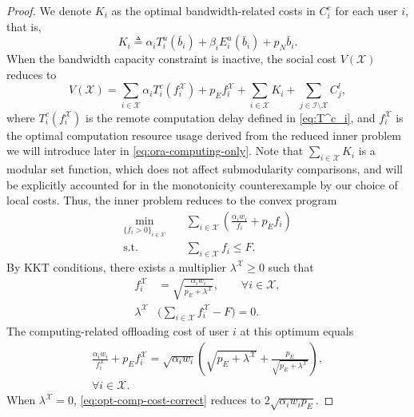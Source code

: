 \documentclass[lettersize,journal]{IEEEtran}
\begin{document}
\begin{proof}
We denote $K_i$ as the optimal bandwidth-related costs in $C^e_i$ for each user $i$, that is,
\begin{equation}
    K_i\triangleq\alpha_iT^u_i(\bar b_i)+\beta_iE^u_i(\bar b_i)+p_N\bar b_i.
\end{equation}
When the bandwidth capacity constraint is inactive, the social cost $V(\mathcal{X})$ reduces to
\begin{equation}
    V(\mathcal{X})=\sum_{i\in\mathcal{X}}\alpha_iT^c_i(f_i^\mathcal{X})+p_Ef_i^{\mathcal{X}}+\sum_{i\in\mathcal{X}}K_i+\sum_{j\in\mathcal{I}\setminus\mathcal{X}}C^l_j,
\end{equation}
where $T^c_i(f_i^\mathcal{X})$ is the remote computation delay defined in \eqref{eq:T^c_i}, and $f_i^{\mathcal{X}}$ is the optimal computation resource usage derived from the reduced inner problem we will introduce later in \eqref{eq:ora-computing-only}. Note that $\sum_{i\in\mathcal{X}}K_i$ is a modular set function, which does not affect submodularity comparisons, and will be explicitly accounted for in the monotonicity counterexample by our choice of local costs.
Thus, the inner problem reduces to the convex program
\begin{align}
\min_{\{f_i>0\}_{i\in\mathcal{X}}}\quad
&\sum_{i\in\mathcal{X}}
\left(\frac{\alpha_i w_i}{f_i}+p_E f_i\right)
\label{eq:ora-computing-only}\\
\text{s.t.}\quad
&\sum_{i\in\mathcal{X}} f_i \le F .
\nonumber
\end{align}
By KKT conditions, there exists a multiplier $\lambda^{\mathcal{X}}\ge 0$ such that
\begin{subequations}\label{eq:kkt-fi}
    \begin{align}
f_i^{\mathcal{X}}
&=
\sqrt{\frac{\alpha_i w_i}{p_E+\lambda^{\mathcal{X}}}},
\qquad \forall i\in\mathcal{X},\\
\lambda^{\mathcal{X}}
&\Big(\sum_{i\in\mathcal{X}} f_i^{\mathcal{X}}-F\Big)=0 .
\end{align}
\end{subequations}
The computing-related offloading cost of user $i$ at this optimum equals
\begin{equation}
    \begin{split}
        \frac{\alpha_i w_i}{f_i^{\mathcal{X}}} + p_E f_i^{\mathcal{X}}
=
\sqrt{\alpha_i w_i}
\left(
\sqrt{p_E+\lambda^{\mathcal{X}}}
+
\frac{p_E}{\sqrt{p_E+\lambda^{\mathcal{X}}}}
\right),\\
 \forall i\in\mathcal{X}.\label{eq:opt-comp-cost-correct}
    \end{split}
\end{equation}
When $\lambda^{\mathcal{X}}=0$, \eqref{eq:opt-comp-cost-correct} reduces to $2\sqrt{\alpha_i w_i p_E}$.


\end{proof}
\end{document}
